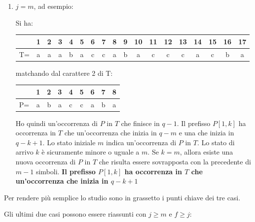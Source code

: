 \documentclass[a4paper,12pt, oneside]{book}
\begin{document}
\begin{enumerate}
\begin{enumerate}
    
    \item $j=m$, ad esempio:
    \begin{esempio}
      Si ha:
      \begin{table}[H]
        \centering
        \begin{tabular}{c||c|c|c|c|c|c|c|c|c|c|c|c|c|c|c|c|c}
          \hline
          & 1 & 2 & 3 & 4 & 5 & 6 & 7 & 8 & 9 & 10 & 11 & 12 & 13 &14&15&16&17\\
          \hline
          T=&a& a & a& b& a& c &c &a &b &a&c&c&c&a &c &b &a\\
          \hline
        \end{tabular}
      \end{table}
      matchando dal carattere 2 di T:
      \begin{table}[H]
        \centering
        \begin{tabular}{c||c|c|c|c|c|c|c|c}
          \hline
          & 1 & 2 & 3 & 4 & 5 & 6 & 7 &8\\
          \hline
          P=&a& b & a& c& c& a&b &a \\
          \hline
        \end{tabular}
      \end{table}
    \end{esempio}
    Ho quindi un'occorrenza di $P$ in $T$ che finisce in $q-1$. Il prefisso
    $P[1,k]$ ha occorrenza in $T$ che un'occorrenza che inizia in $q-m$ e una
    che inizia in $q-k+1$. Lo stato iniziale $m$ indica un’occorrenza di $P$ in
    $T$. Lo stato di arrivo $k$ è sicuramente minore o uguale a $m$. Se $k = m$,
    allora esiste una nuova occorrenza di $P$ in $T$ che risulta essere
    sovrapposta con la precedente di $m-1$ simboli. \textbf{Il prefisso
    $P[1,k]$ ha occorrenza in $T$ che un'occorrenza che inizia in $q-k+1$}
    

    \begin{center}
    \end{center}
  \end{enumerate}
  Per rendere più semplice lo studio sono in grassetto i punti chiave dei tre
  casi. 
\end{enumerate}
Gli ultimi due casi possono essere riassunti con $j\geq m$ e $f\geq j$:
\end{document}
